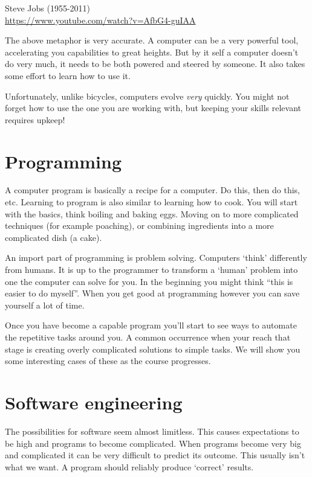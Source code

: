 	\hfill Steve Jobs (1955-2011)\\
	
	\url{https://www.youtube.com/watch?v=AfbG4-guIAA}
	
	The above metaphor is very accurate.
	A computer can be a very powerful tool, accelerating you capabilities to great heights. 
	But by it self a computer doesn't do very much, it needs to be both powered and steered by someone.
	It also takes some effort to learn how to use it.
	
	Unfortunately, unlike bicycles, computers evolve \emph{very} quickly. 
	You might not forget how to use the one you are working with, but keeping your skills relevant requires upkeep!

	\section{Programming}
	
	A computer program is basically a recipe for a computer.
	Do this, then do this, etc.
	Learning to program is also similar to learning how to cook.
	You will start with the basics, think boiling and baking eggs.
	Moving on to more complicated techniques (for example poaching), or combining ingredients into a more complicated dish (a cake).
	
	An import part of programming is problem solving.
	Computers `think' differently from humans.
	It is up to the programmer to transform a `human' problem into one the computer can solve for you.
	In the beginning you might think ``this is easier to do myself''.
	When you get good at programming however you can save yourself a lot of time.
	
	Once you have become a capable program you'll start to see ways to automate the repetitive tasks around you.
	A common occurrence when your reach that stage is creating overly complicated solutions to simple tasks.
	We will show you some interesting cases of these as the course progresses.

	\section{Software engineering}
	
	The possibilities for software seem almost limitless.
	This causes expectations to be high and programs to become complicated.
	When programs become very big and complicated it can be very difficult to predict its outcome.
	This usually isn't what we want.
	A program should reliably produce `correct' results.
	
